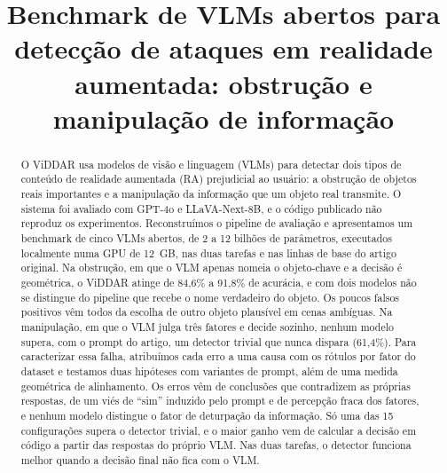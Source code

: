 \documentclass[conference]{IEEEtran}
\begin{document}
\title{Benchmark de VLMs abertos para detecção de ataques em realidade aumentada: obstrução e
manipulação de informação}

\author{
\and
{}
}

\maketitle

\begin{abstract}
O ViDDAR usa modelos de visão e linguagem (VLMs) para detectar dois tipos de conteúdo de realidade
aumentada (RA) prejudicial ao usuário: a obstrução de objetos reais importantes e a manipulação da
informação que um objeto real transmite. O sistema foi avaliado com GPT-4o e LLaVA-Next-8B, e o código
publicado não reproduz os experimentos. Reconstruímos o pipeline de avaliação e apresentamos um
benchmark de cinco VLMs abertos, de 2 a 12 bilhões de parâmetros, executados localmente numa GPU de
12~GB, nas duas tarefas e nas linhas de base do artigo original. Na obstrução, em que o VLM apenas nomeia
o objeto-chave e a decisão é geométrica, o ViDDAR atinge de 84,6\% a 91,8\% de acurácia, e com dois
modelos não se distingue do pipeline que recebe o nome verdadeiro do objeto. Os poucos falsos positivos
vêm todos da escolha de outro objeto plausível em cenas ambíguas. Na manipulação, em que o VLM julga
três fatores e decide sozinho, nenhum modelo supera, com o prompt do artigo, um detector trivial que nunca
dispara (61,4\%). Para caracterizar essa falha, atribuímos cada erro a uma causa com os rótulos por fator
do dataset e testamos duas hipóteses com variantes de prompt, além de uma medida geométrica de
alinhamento. Os erros vêm de conclusões que contradizem as próprias respostas, de um viés de ``sim''
induzido pelo prompt e de percepção fraca dos fatores, e nenhum modelo distingue o fator de deturpação da
informação. Só uma das 15 configurações supera o detector trivial, e o maior ganho vem de calcular a
decisão em código a partir das respostas do próprio VLM. Nas duas tarefas, o detector funciona melhor
quando a decisão final não fica com o VLM.
\end{abstract}
\end{document}
